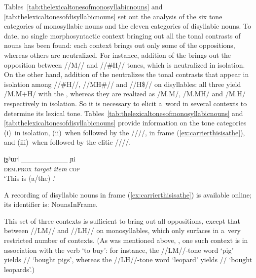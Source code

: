 {{{{{Tables~\ref{tab:thelexicaltonesofmonosyllabicnouns} and \ref{tab:thelexicaltonesofdisyllabicnouns} set out the analysis of the six tone categories of monosyllabic nouns and the eleven
categories of disyllabic nouns. To date, no single morphosyntactic context bringing out all the
tonal contrasts of nouns has been found: each context brings out only some of the oppositions,
whereas others are neutralized. For instance, addition of the  brings out the opposition
between \mbox{//M//} and \mbox{//\#H//} tones, which is neutralized in isolation. 
On the
other hand, addition of the  neutralizes the tonal contrasts that appear in isolation among
\mbox{//\#H//}, \mbox{//MH\#//} and \mbox{//H\$//} on disyllables: all three yield /M.M+H/ with the , whereas they
are realized as /M.M/, /M.MH/ and /M.H/ respectively in isolation. So it is necessary to elicit
a~word in several contexts to determine its lexical tone. Tables~\ref{tab:thelexicaltonesofmonosyllabicnouns} and \ref{tab:thelexicaltonesofdisyllabicnouns} provide information on the tone
categories (i)~in isolation, (ii)~when followed by the  ////, in frame (\ref{ex:carrierthisisathe}), and (iii)~when followed by the  clitic ////.
\begin{exe}
  \ex
  \label{ex:carrierthisisathe}
  \gll ʈʂʰɯ˧ {\_\_\_\_\_\_\_\_\_} ɲi\\
  \textsc{dem.prox} \textit{{target item}}	\textsc{cop}\\
  \glt	‘This is \mbox{(a/the)} \ipa{{\_\_\_\_\_\_\_\_\_}}.’
\end{exe}

A recording of disyllabic nouns in frame (\ref{ex:carrierthisisathe}) is available online; its identifier is: NounsInFrame.

This set of three contexts is sufficient to bring out all oppositions, except that between \mbox{//LM//}
and \mbox{//LH//} on monosyllables, which only surfaces in a~very restricted number of contexts. (As was mentioned above,
, one such context is in association with the verb ‘to buy’: for instance, the \mbox{//LM//}-tone word
‘pig’ yields // ‘bought pigs’, whereas the \mbox{//LH//}-tone word ‘leopard’
yields // ‘bought leopards’.)

}}}}}
